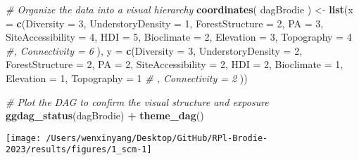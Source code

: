 \documentclass[
]{article}
\newenvironment{Shaded}{\begin{snugshade}}{\end{snugshade}}
\newcommand{\AttributeTok}[1]{\textcolor[rgb]{0.13,0.29,0.53}{#1}}
\newcommand{\CommentTok}[1]{\textcolor[rgb]{0.56,0.35,0.01}{\textit{#1}}}
\newcommand{\DecValTok}[1]{\textcolor[rgb]{0.00,0.00,0.81}{#1}}
\newcommand{\FunctionTok}[1]{\textcolor[rgb]{0.13,0.29,0.53}{\textbf{#1}}}
\newcommand{\NormalTok}[1]{#1}
\newcommand{\OtherTok}[1]{\textcolor[rgb]{0.56,0.35,0.01}{#1}}
\newcommand{\SpecialCharTok}[1]{\textcolor[rgb]{0.81,0.36,0.00}{\textbf{#1}}}
\begin{document}
\begin{Shaded}
\begin{Highlighting}[]
\CommentTok{\# Organize the data into a visual hierarchy}
\FunctionTok{coordinates}\NormalTok{( dagBrodie ) }\OtherTok{\textless{}{-}}  \FunctionTok{list}\NormalTok{(}\AttributeTok{x =} \FunctionTok{c}\NormalTok{(}\AttributeTok{Diversity =} \DecValTok{3}\NormalTok{, }
                                        \AttributeTok{UnderstoryDensity =} \DecValTok{1}\NormalTok{, }
                                        \AttributeTok{ForestStructure =} \DecValTok{2}\NormalTok{, }
                                        \AttributeTok{PA =} \DecValTok{3}\NormalTok{, }
                                        \AttributeTok{SiteAccessibility =} \DecValTok{4}\NormalTok{, }
                                        \AttributeTok{HDI =} \DecValTok{5}\NormalTok{, }
                                        \AttributeTok{Bioclimate =} \DecValTok{2}\NormalTok{, }
                                        \AttributeTok{Elevation =} \DecValTok{3}\NormalTok{, }
                                        \AttributeTok{Topography =} \DecValTok{4}
                                        \CommentTok{\#, Connectivity = 6}
\NormalTok{                                        ),}
                                  \AttributeTok{y =} \FunctionTok{c}\NormalTok{(}\AttributeTok{Diversity =} \DecValTok{3}\NormalTok{, }
                                        \AttributeTok{UnderstoryDensity =} \DecValTok{2}\NormalTok{, }
                                        \AttributeTok{ForestStructure =} \DecValTok{2}\NormalTok{, }
                                        \AttributeTok{PA =} \DecValTok{2}\NormalTok{, }
                                        \AttributeTok{SiteAccessibility =} \DecValTok{2}\NormalTok{, }
                                        \AttributeTok{HDI =} \DecValTok{2}\NormalTok{, }
                                        \AttributeTok{Bioclimate =} \DecValTok{1}\NormalTok{, }
                                        \AttributeTok{Elevation =} \DecValTok{1}\NormalTok{, }
                                        \AttributeTok{Topography =} \DecValTok{1}
                                    \CommentTok{\#    , Connectivity = 2}
\NormalTok{                                        ))}

\CommentTok{\# Plot the DAG to confirm the visual structure and exposure}
\FunctionTok{ggdag\_status}\NormalTok{(dagBrodie) }\SpecialCharTok{+} \FunctionTok{theme\_dag}\NormalTok{()}
\end{Highlighting}
\end{Shaded}

\texttt{[image: /Users/wenxinyang/Desktop/GitHub/RPl-Brodie-2023/results/figures/1\_scm-1]}
\end{document}
